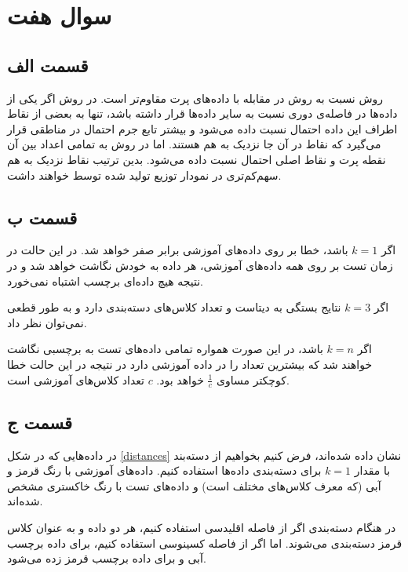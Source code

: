 \documentclass{article}
\begin{document}
\section*{سوال هفت}

\subsection*{قسمت الف}

روش  نسبت به روش  در مقابله با داده‌های پرت مقاوم‌تر است. در روش 
اگر یکی از داده‌ها در فاصله‌ی دوری نسبت به سایر داده‌ها قرار داشته باشد، تنها به بعضی از نقاط اطراف
این داده احتمال نسبت داده می‌شود و بیشتر تابع جرم احتمال در مناطقی قرار می‌گیرد که نقاط در آن جا نزدیک به
هم هستند. اما در روش  به تمامی اعداد بین آن نقطه پرت و نقاط اصلی احتمال نسبت داده می‌شود.
بدین ترتیب نقاط نزدیک به هم سهم‌کم‌تری در نمودار توزیع تولید شده توسط  خواهند داشت.

\subsection*{قسمت ب}

اگر $k=1$ باشد، خطا بر روی داده‌های آموزشی برابر صفر خواهد شد. در این حالت در زمان تست بر روی همه داده‌های آموزشی،
هر داده به خودش نگاشت خواهد شد و در نتیجه هیچ داده‌ای برچسب اشتباه نمی‌خورد.

اگر $k=3$ نتایج بستگی به دیتاست و تعداد کلاس‌های دسته‌بندی دارد و به طور قطعی نمی‌توان نظر داد.

اگر $k=n$ باشد، در این صورت همواره تمامی داده‌های تست به برچسبی نگاشت خواهند شد که بیشترین تعداد را در داده آموزشی
دارد در نتیجه در این حالت خطا کوچکتر مساوی $\frac{1}{c}$ خواهد بود. $c$ تعداد کلاس‌های آموزشی است.

\subsection*{قسمت ج}

در داده‌هایی که در شکل \ref{distances} نشان داده شده‌اند، فرض کنیم بخواهیم از دسته‌بند  با مقدار
$k=1$ برای دسته‌بندی داده‌ها استفاده کنیم. داده‌های آموزشی با رنگ قرمز و آبی (که معرف کلاس‌های مختلف است) و داده‌های
تست با رنگ خاکستری مشخص شده‌اند.

در هنگام دسته‌بندی اگر از فاصله اقلیدسی استفاده کنیم، هر دو داده  و  به عنوان کلاس قرمز دسته‌بندی می‌شوند.
اما اگر از فاصله کسینوسی استفاده کنیم، برای داده  برچسب آبی و برای داده  برچسب قرمز زده می‌شود.
\end{document}
